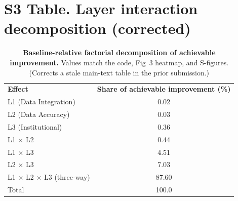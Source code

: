 \documentclass[10pt,letterpaper]{article}
\newlength\savedwidth
\newcommand\thickhline{\noalign{\global\savedwidth\arrayrulewidth\global\arrayrulewidth 2pt}\hline\noalign{\global\arrayrulewidth\savedwidth}}
\begin{document}
\section*{S3 Table. Layer interaction decomposition (corrected)}
\begin{table}[!ht]\centering
\caption{{\bf Baseline-relative factorial decomposition of achievable improvement.} Values match the code, Fig~3 heatmap, and S-figures. (Corrects a stale main-text table in the prior submission.)}
\label{S3}
\begin{tabular}{l c}
\hline \textbf{Effect} & \textbf{Share of achievable improvement (\%)} \\ \thickhline
L1 (Data Integration) & 0.02 \\
L2 (Data Accuracy) & 0.03 \\
L3 (Institutional) & 0.36 \\ \hline
L1 $\times$ L2 & 0.44 \\
L1 $\times$ L3 & 4.51 \\
L2 $\times$ L3 & 7.03 \\ \hline
L1 $\times$ L2 $\times$ L3 (three-way) & 87.60 \\ \thickhline
Total & 100.0 \\ \hline
\end{tabular}
\end{table}

\end{document}
